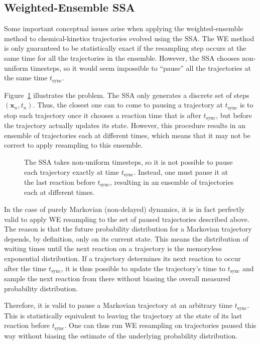 \documentclass[english,letterpaper,12pt]{article}
\renewcommand{\vec}[1]{\ensuremath{\mathbf{#1}}}
\begin{document}
\begin{doublespacing}
\subsection{Weighted-Ensemble SSA} %
\label{sub:wessa}

Some important conceptual issues arise when applying the weighted-ensemble method to chemical-kinetics trajectories evolved using the SSA. The WE method is only guaranteed to be statistically exact if the resampling step occurs at the same time for all the trajectories in the ensemble. However, the SSA chooses non-uniform timesteps, so it would seem impossible to ``pause'' all the trajectories at the same time $t_\text{sync}$. 

Figure~\ref{fig:wessa-pause} illustrates the problem. The SSA only generates a discrete set of steps $(\vec{x}_n, t_n)$. Thus, the closest one can to come to pausing a trajectory at $t_\text{sync}$ is to stop each trajectory once it chooses a reaction time that is after $t_\text{sync}$, but before the trajectory actually updates its state. However, this procedure results in an ensemble of trajectories each at different times, which means that it may not be correct to apply resampling to this ensemble.

\begin{figure}[ht]
    \centering
    \def\svgwidth{0.65\textwidth}
    
    \caption{The SSA takes non-uniform timesteps, so it is not possible to pause each trajectory exactly at time $t_\text{sync}$. Instead, one must pause it at the last reaction before $t_\text{sync}$, resulting in an ensemble of trajectories each at different times.}
    \label{fig:wessa-pause}
\end{figure}

In the case of purely Markovian (non-delayed) dynamics, it is in fact perfectly valid to apply WE resampling to the set of paused trajectories described above. The reason is that the future probability distribution for a Markovian trajectory depends, by definition, only on its current state. This means the distribution of waiting times until the next reaction on a trajectory is the memoryless exponential distribution. If a trajectory determines its next reaction to occur after the time $t_\text{sync}$, it is thus possible to update the trajectory's time to $t_\text{sync}$ and sample the next reaction from there without biasing the overall measured probability distribution.

Therefore, it is valid to pause a Markovian trajectory at an arbitrary time $t_\text{sync}$. This is statistically equivalent to leaving the trajectory at the state of its last reaction before $t_\text{sync}$. One can thus run WE resampling on trajectories paused this way without biasing the estimate of the underlying probability distribution.


\end{doublespacing}
\end{document}
